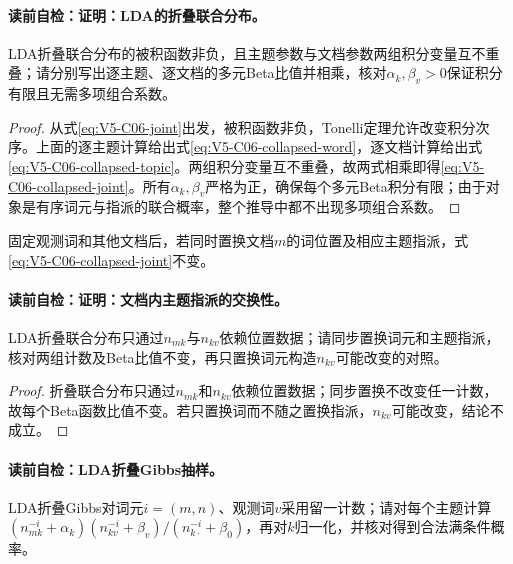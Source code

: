 \paragraph{读前自检：证明：LDA的折叠联合分布。}LDA折叠联合分布的被积函数非负，且主题参数与文档参数两组积分变量互不重叠；请分别写出逐主题、逐文档的多元Beta比值并相乘，核对$\alpha_k,\beta_v>0$保证积分有限且无需多项组合系数。\par

\begin{proof}
从式\eqref{eq:V5-C06-joint}出发，被积函数非负，Tonelli定理允许改变积分次序。上面的逐主题计算给出式\eqref{eq:V5-C06-collapsed-word}，逐文档计算给出式\eqref{eq:V5-C06-collapsed-topic}。两组积分变量互不重叠，故两式相乘即得\eqref{eq:V5-C06-collapsed-joint}。所有$\alpha_k,\beta_v$严格为正，确保每个多元Beta积分有限；由于对象是有序词元与指派的联合概率，整个推导中都不出现多项组合系数。
\end{proof}

\label{struct:V5-C06-CH13}
\begin{corollary}[文档内主题指派的交换性]\label{cor:V5-C06-topic-exchangeable}
固定观测词和其他文档后，若同时置换文档$m$的词位置及相应主题指派，式
\eqref{eq:V5-C06-collapsed-joint}不变。
\end{corollary}
\paragraph{读前自检：证明：文档内主题指派的交换性。}LDA折叠联合分布只通过$n_{mk}$与$n_{kv}$依赖位置数据；请同步置换词元和主题指派，核对两组计数及Beta比值不变，再只置换词元构造$n_{kv}$可能改变的对照。\par

\begin{proof}
折叠联合分布只通过$n_{mk}$和$n_{kv}$依赖位置数据；同步置换不改变任一计数，
故每个Beta函数比值不变。若只置换词而不随之置换指派，$n_{kv}$可能改变，结论不成立。
\end{proof}

\paragraph{读前自检：LDA折叠Gibbs抽样。}LDA折叠Gibbs对词元$i=(m,n)$、观测词$v$采用留一计数；请对每个主题计算$(n_{mk}^{-i}+\alpha_k)(n_{kv}^{-i}+\beta_v)/(n_{k\cdot}^{-i}+\beta_0)$，再对$k$归一化，并核对得到合法满条件概率。\par
